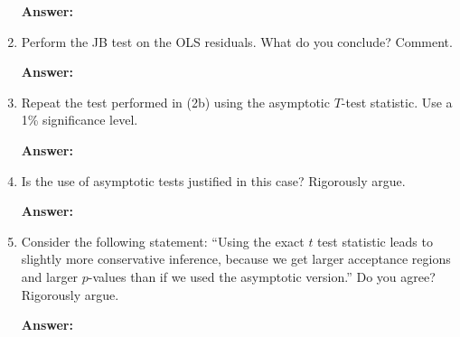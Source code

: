 \documentclass[12pt,a4paper]{article}
\begin{document}
\begin{enumerate}[label=(\alph*)]
  \textbf{Answer:} 
  
  \item Perform the JB test on the OLS residuals. What do you conclude? Comment.
  
  \textbf{Answer:} 
  
  \item Repeat the test performed in (2b) using the asymptotic $T$-test statistic. Use a 1\% significance level.
  
  \textbf{Answer:} 
  
  \item Is the use of asymptotic tests justified in this case? Rigorously argue.
  
  \textbf{Answer:} 
  
  \item Consider the following statement: ``Using the exact $t$ test statistic leads to slightly more conservative inference, because we get larger acceptance regions and larger $p$-values than if we used the asymptotic version.'' Do you agree? Rigorously argue.
  
  \textbf{Answer:} 
\end{enumerate}
\end{document}
